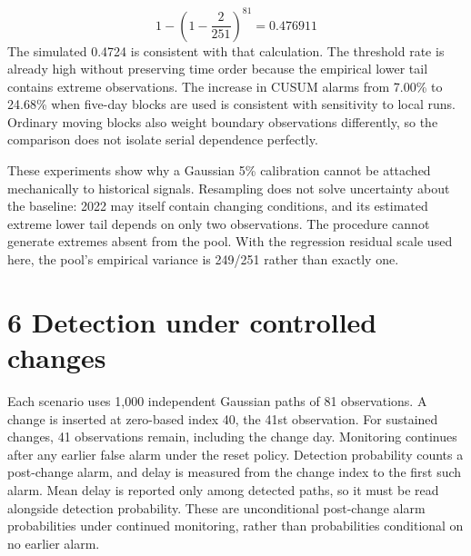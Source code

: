 \documentclass[11pt,a4paper]{article}
\begin{document}
\begin{equation}1-\left(1-\frac{2}{251}\right)^{81}=0.476911\label{eq:tail_probability}\end{equation}
The simulated 0.4724 is consistent with that calculation. The threshold rate is already high without preserving time order because the empirical lower tail contains extreme observations. The increase in CUSUM alarms from 7.00\% to 24.68\% when five-day blocks are used is consistent with sensitivity to local runs. Ordinary moving blocks also weight boundary observations differently, so the comparison does not isolate serial dependence perfectly.

These experiments show why a Gaussian 5\% calibration cannot be attached mechanically to historical signals. Resampling does not solve uncertainty about the baseline: 2022 may itself contain changing conditions, and its estimated extreme lower tail depends on only two observations. The procedure cannot generate extremes absent from the pool. With the regression residual scale used here, the pool's empirical variance is 249/251 rather than exactly one.

\clearpage
\section*{6 Detection under controlled changes}
Each scenario uses 1,000 independent Gaussian paths of 81 observations. A change is inserted at zero-based index 40, the 41st observation. For sustained changes, 41 observations remain, including the change day. Monitoring continues after any earlier false alarm under the reset policy. Detection probability counts a post-change alarm, and delay is measured from the change index to the first such alarm. Mean delay is reported only among detected paths, so it must be read alongside detection probability. These are unconditional post-change alarm probabilities under continued monitoring, rather than probabilities conditional on no earlier alarm.
\end{document}
